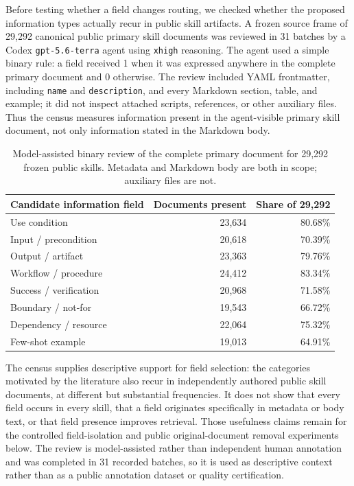 Before testing whether a field changes routing, we checked whether the proposed information types actually recur in public skill artifacts. A frozen source frame of 29,292 canonical public primary skill documents was reviewed in 31 batches by a Codex \texttt{gpt-5.6-terra} agent using \texttt{xhigh} reasoning. The agent used a simple binary rule: a field received 1 when it was expressed anywhere in the complete primary document and 0 otherwise. The review included YAML frontmatter, including \texttt{name} and \texttt{description}, and every Markdown section, table, and example; it did not inspect attached scripts, references, or other auxiliary files. Thus the census measures information present in the agent-visible primary skill document, not only information stated in the Markdown body.

\begin{table}[H]
\centering
\small
\begin{tabular}{lrr}
\toprule
Candidate information field & Documents present & Share of 29,292 \\
\midrule
Use condition & 23,634 & 80.68\% \\
Input / precondition & 20,618 & 70.39\% \\
Output / artifact & 23,363 & 79.76\% \\
Workflow / procedure & 24,412 & 83.34\% \\
Success / verification & 20,968 & 71.58\% \\
Boundary / not-for & 19,543 & 66.72\% \\
Dependency / resource & 22,064 & 75.32\% \\
Few-shot example & 19,013 & 64.91\% \\
\bottomrule
\end{tabular}
\caption{Model-assisted binary review of the complete primary document for 29,292 frozen public skills. Metadata and Markdown body are both in scope; auxiliary files are not.}
\label{tab:rq1-public-field-prevalence}
\end{table}

The census supplies descriptive support for field selection: the categories motivated by the literature also recur in independently authored public skill documents, at different but substantial frequencies. It does not show that every field occurs in every skill, that a field originates specifically in metadata or body text, or that field presence improves retrieval. Those usefulness claims remain for the controlled field-isolation and public original-document removal experiments below. The review is model-assisted rather than independent human annotation and was completed in 31 recorded batches, so it is used as descriptive context rather than as a public annotation dataset or quality certification.

